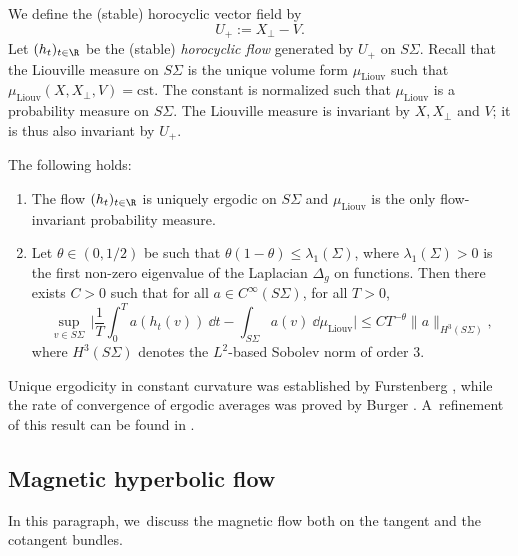 We define the (stable) horocyclic vector field by
\[
U_+ := X_\perp - V.
\]
Let $(h_t)_{t \in \R}$ be the (stable) \emph{horocyclic flow} generated by $U_+$ on $S\Sigma$. Recall that the Liouville measure on $S\Sigma$ is the unique volume form $\mu_{\mathrm{Liouv}}$ such that $\mu_{\mathrm{Liouv}}(X,X_\perp,V) = \mathrm{cst}$. The constant is normalized such that $\mu_{\mathrm{Liouv}}$ is a probability measure on $S\Sigma$. The Liouville measure is invariant by $X, X_\perp$ and $V$; it is thus also invariant by $U_+$.

\begin{theorem}
\label{lemma:horocycle}
The following holds:
\begin{enumerate}
\item\label{lemma:horocyclei} The flow $(h_t)_{t \in \R}$ is uniquely ergodic on $S\Sigma$ and $\mu_{\mathrm{Liouv}}$ is the only flow-invariant probability measure.

\item\label{lemma:horocycleii} Let $\theta\in(0,1/2)$ be such that $\theta(1-\theta) \leq \lambda_1(\Sigma)$, where $\lambda_1(\Sigma) > 0$ is the first non-zero eigenvalue of the Laplacian $\Delta_g$ on functions. Then there exists $C > 0$ such that for all $a \in C^{\infty}(S\Sigma)$, for all $T > 0$,
\[
\sup_{v \in S\Sigma}\, \biggl|\dfrac{1}{T}\int_0^T a(h_t(v))~ \dd t - \int_{S\Sigma} a(v) ~\dd\mu_{\mathrm{Liouv}}\biggr| \leq C T^{-\theta} \|a\|_{H^3(S\Sigma)},
\]
where $H^3(S\Sigma)$ denotes the $L^2$-based Sobolev norm of order $3$.
\end{enumerate}
\end{theorem}

Unique ergodicity in constant curvature was established by Furstenberg \cite{Furstenberg-73}, while the rate of convergence of ergodic averages was proved by Burger \cite{Burger-90}. A~refinement of this result can be found in \cite{Flaminio-Forni-03}.

\subsection{Magnetic hyperbolic flow}

\label{ssection:magnetic-flow}

In this paragraph, we~discuss the magnetic flow both on the tangent and the cotangent bundles.

